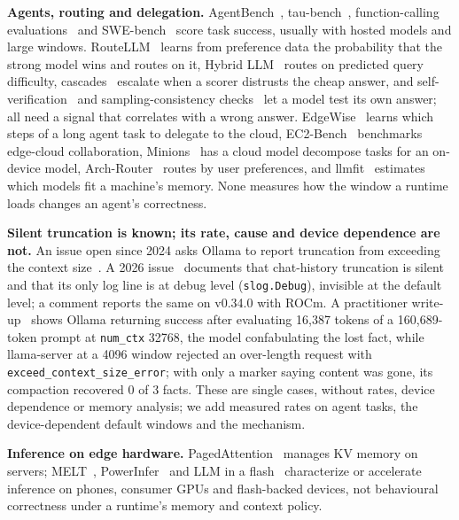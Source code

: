 \documentclass[conference,10pt]{IEEEtran}
\begin{document}
\textbf{Agents, routing and delegation.} AgentBench~\cite{liu2024agentbench}, tau-bench~\cite{yao2024taubench}, function-calling evaluations~\cite{patil2024gorilla} and SWE-bench~\cite{jimenez2024swebench} score task success, usually with hosted models and large windows. RouteLLM~\cite{routellm} learns from preference data the probability that the strong model wins and routes on it, Hybrid LLM~\cite{ding2024hybrid} routes on predicted query difficulty, cascades~\cite{chen2023frugalgpt} escalate when a scorer distrusts the cheap answer, and self-verification~\cite{weng2023selfverification} and sampling-consistency checks~\cite{manakul2023selfcheckgpt} let a model test its own answer; all need a signal that correlates with a wrong answer. EdgeWise~\cite{shi2026edgewise} learns which steps of a long agent task to delegate to the cloud, EC2-Bench~\cite{huang2026ec2bench} benchmarks edge-cloud collaboration, Minions~\cite{narayan2025minions} has a cloud model decompose tasks for an on-device model, Arch-Router~\cite{tran2025archrouter} routes by user preferences, and llmfit~\cite{llmfit} estimates which models fit a machine's memory. None measures how the window a runtime loads changes an agent's correctness.

\textbf{Silent truncation is known; its rate, cause and device dependence are not.} An issue open since 2024 asks Ollama to report truncation from exceeding the context size~\cite{ollama3839}. A 2026 issue~\cite{ollama14259} documents that chat-history truncation is silent and that its only log line is at debug level (\texttt{slog.Debug}), invisible at the default level; a comment reports the same on v0.34.0 with ROCm. A practitioner write-up~\cite{desbiens2026contextpaw} shows Ollama returning success after evaluating 16,387 tokens of a 160,689-token prompt at \texttt{num\_ctx} 32768, the model confabulating the lost fact, while llama-server at a 4096 window rejected an over-length request with \texttt{exceed\_context\_size\_error}; with only a marker saying content was gone, its compaction recovered 0 of 3 facts. These are single cases, without rates, device dependence or memory analysis; we add measured rates on agent tasks, the device-dependent default windows and the mechanism.

\textbf{Inference on edge hardware.} PagedAttention~\cite{kwon2023vllm} manages KV memory on servers; MELT~\cite{laskaridis2024melt}, PowerInfer~\cite{song2024powerinfer} and LLM in a flash~\cite{edge_llm_serving} characterize or accelerate inference on phones, consumer GPUs and flash-backed devices, not behavioural correctness under a runtime's memory and context policy.
\end{document}
